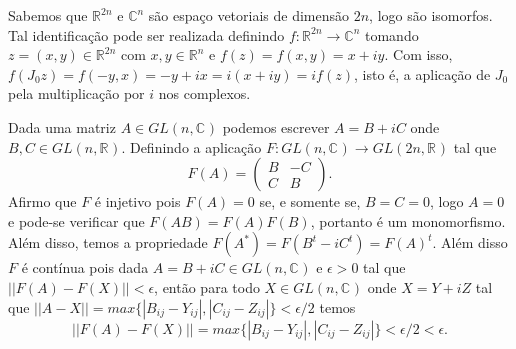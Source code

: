 \documentclass[12pt]{book}
\newcommand{\generalgroup}[2]{GL(#1, #2)}
\newcommand{\generalgroupreal}[1]{\generalgroup{#1}{\real{}}}
\newcommand{\generalgroupcomplexo}[1]{\generalgroup{#1}{\complexo{}}}
\newcommand{\real}[1]{\mathbb{R}^{#1}}
\newcommand{\complexo}[1]{\mathbb{C}^{#1}}
\begin{document}
	Sabemos que $\real{2n}$ e $\mathbb{C}^{n}$ são espaço vetoriais de dimensão $2n$, logo são isomorfos. Tal identificação pode ser realizada definindo $f:\real{2n}\to \complexo{n}$ tomando $z=(x,y) \in \real{2n}$ com $x,y \in \real{n}$ e $f(z) = f(x,y) =x+iy $. Com isso, $f(J_{0}z) = f(-y, x) = -y +ix = i(x+iy) = if(z)$, isto é, a aplicação de $J_{0}$ pela multiplicação por $i$ nos complexos. 
	
	Dada uma matriz $A \in \generalgroupcomplexo{n}$ podemos escrever $A = B+iC$ onde $B,C \in \generalgroupreal{n}$. Definindo a aplicação $F:\generalgroupcomplexo{n} \to \generalgroupreal{2n}$ tal que 
	$$
	F(A)=
	\left(
	\begin{array}{cc}
	B & -C
	\\
	C & B
	\end{array}
	\right).
	$$
	Afirmo que $F$ é injetivo pois $F(A) = 0$ se, e somente se, $B=C=0$, logo $A=0$ e pode-se verificar que $F(AB)=F(A)F(B)$, portanto é um monomorfismo. Além disso, temos a propriedade $F(A^{*}) = F(B^{t} - iC^{t}) = F(A)^{t}$. Além disso $F$ é contínua pois dada $A=B+iC \in \generalgroupcomplexo{n}$ e $\epsilon > 0$ tal que $||F(A) - F(X)|| < \epsilon$, então para todo $X \in \generalgroupcomplexo{n}$ onde $X= Y+iZ$ tal que $||A - X||=max \{|B_{ij} - Y_{ij}|,  |C_{ij} - Z_{ij}|\} < \epsilon/2$ temos
	$$
	||F(A) - F(X)|| = max \{|B_{ij} - Y_{ij}|, |C_{ij} - Z_{ij}| \}< \epsilon/2 < \epsilon.
	$$
	
\end{document}
